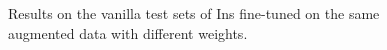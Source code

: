 \begin{figure}[h]
	\centering
	\begin{minipage}[t]{0.5\linewidth}
		\centering
	\end{minipage}%
	\begin{minipage}[t]{0.5\linewidth}
		\centering
	\end{minipage}%
	\centering
	\caption{Results on the vanilla test sets of Ins fine-tuned on the same augmented data with different weights.} 
	\label{fig:hyperparameter}
\end{figure}

